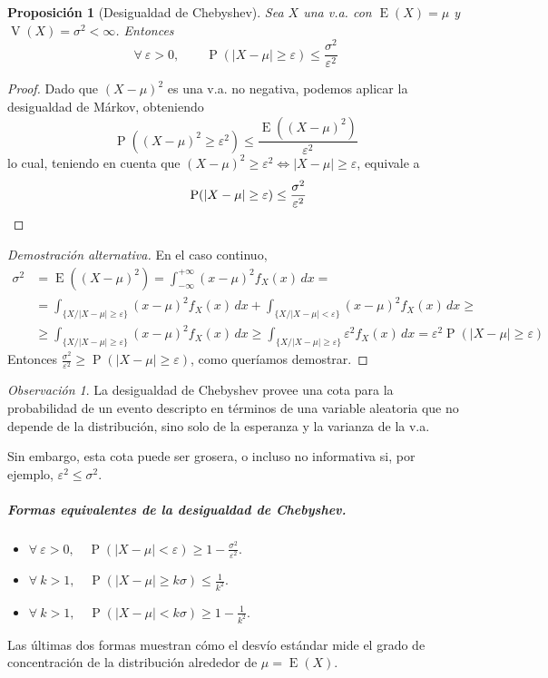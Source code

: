 \documentclass[11pt]{article}
\theoremstyle{plain}
\newtheorem*{pro}{Proposición}
\theoremstyle{definition}
\theoremstyle{remark}
\newtheorem*{obs}{Observación}
\newcommand{\proba}{\ensuremath{\operatorname{P}}}  %
\newcommand{\esp}[0]{\ensuremath{\operatorname{E}}}  %
\newcommand{\var}[0]{\ensuremath{\operatorname{V}}}  %
\newcommand{\foralle}{\ensuremath{\forall \ }}  %
\begin{document}
    \begin{pro}[Desigualdad de Chebyshev]
      Sea $X$ una v.a. con $\esp(X) = \mu$ y $\var(X) = \sigma^2 < \infty$. Entonces
      \[ \foralle \varepsilon > 0, \qquad \proba(\vert X - \mu \vert \geq \varepsilon) \leq \frac{\sigma^2}{\varepsilon^2} \]
    \end{pro}
    \begin{proof}
      Dado que $(X - \mu)^2$ es una v.a. no negativa, podemos aplicar la desigualdad de Márkov, obteniendo
      \[ \proba((X - \mu)^2 \geq \varepsilon^2) \leq \frac{\esp \left((X - \mu)^2 \right)}{\varepsilon^2}\]
      lo cual, teniendo en cuenta que $ (X - \mu)^2 \geq \varepsilon^2 \Leftrightarrow \vert X - \mu \vert \geq \varepsilon $, equivale a
      \[ \qquad \proba(\vert X - \mu \vert \geq \varepsilon) \leq \frac{\sigma^2}{\varepsilon^2} \qedhere \]
    \end{proof}
    \begin{proof} [Demostración alternativa]
      En el caso continuo,
      \[ \begin{split}
        \sigma^2 &= \esp \left( (X - \mu)^2 \right) = \int_{-\infty}^{+\infty} (x - \mu)^2 f_X(x) \,dx = \\
        &= \int_{\lbrace X / \vert X - \mu \vert \geq \varepsilon \rbrace} (x - \mu)^2 f_X(x) \,dx + \int_{\lbrace X / \vert X - \mu \vert < \varepsilon \rbrace} (x - \mu)^2 f_X(x) \,dx \geq \\
        &\geq \int_{\lbrace X / \vert X - \mu \vert \geq \varepsilon \rbrace} (x - \mu)^2 f_X(x) \,dx \geq \int_{\lbrace X / \vert X - \mu \vert \geq \varepsilon \rbrace} \varepsilon^2 f_X(x) \,dx = \varepsilon^2 \proba(\vert X - \mu \vert \geq \varepsilon)
      \end{split} \]
      Entonces $\frac{\sigma^2}{\varepsilon^2} \geq \proba(\vert X - \mu \vert \geq \varepsilon)$, como queríamos demostrar.
    \end{proof}

    \begin{obs}
      La desigualdad de Chebyshev provee una cota para la probabilidad de un evento descripto en términos de una variable aleatoria que no depende de la distribución, sino solo de la esperanza y la varianza de la v.a.

      Sin embargo, esta cota puede ser grosera, o incluso no informativa si, por ejemplo, $\varepsilon^2 \leq \sigma^2$.
    \end{obs}

    \subparagraph{Formas equivalentes de la desigualdad de Chebyshev.}
    \begin{itemize}
      \item $\foralle \varepsilon > 0, \quad \proba(\vert X - \mu \vert < \varepsilon) \geq 1 - \frac{\sigma^2}{\varepsilon^2}$.
      \item $\foralle k > 1, \quad \proba(\vert X - \mu \vert \geq k \sigma) \leq \frac{1}{k^2}$.
      \item $\foralle k > 1, \quad \proba(\vert X - \mu \vert < k \sigma) \geq 1 - \frac{1}{k^2}$.
    \end{itemize}
    Las últimas dos formas muestran cómo el desvío estándar mide el grado de concentración de la distribución alrededor de $\mu = \esp(X)$.
\end{document}
